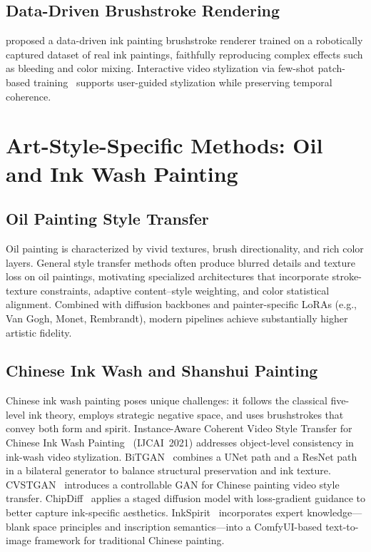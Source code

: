 \documentclass[letterpaper,twocolumn,10pt]{article}
\begin{document}
\subsection{Data-Driven Brushstroke Rendering}

\citet{madono2023data} proposed a data-driven ink painting brushstroke renderer trained
on a robotically captured dataset of real ink paintings, faithfully reproducing complex
effects such as bleeding and color mixing. Interactive video stylization via few-shot
patch-based training~\cite{texler2020interactive} supports user-guided stylization while
preserving temporal coherence.

\section{Art-Style-Specific Methods: Oil and Ink Wash Painting}
\label{sec:artstyle}

\subsection{Oil Painting Style Transfer}

Oil painting is characterized by vivid textures, brush directionality, and rich color
layers. General style transfer methods often produce blurred details and texture loss on
oil paintings, motivating specialized architectures that incorporate stroke-texture
constraints, adaptive content--style weighting, and color statistical alignment.
Combined with diffusion backbones and painter-specific LoRAs (e.g., Van Gogh, Monet,
Rembrandt), modern pipelines achieve substantially higher artistic fidelity.

\subsection{Chinese Ink Wash and Shanshui Painting}

Chinese ink wash painting poses unique challenges: it follows the classical five-level
ink theory, employs strategic negative space, and uses brushstrokes that convey both
form and spirit. Instance-Aware Coherent Video Style Transfer for Chinese Ink Wash
Painting~\cite{liang2021instance} (IJCAI~2021) addresses object-level consistency in
ink-wash video stylization. BiTGAN~\cite{he2023bitgan} combines a UNet path and a ResNet
path in a bilateral generator to balance structural preservation and ink texture.
CVSTGAN~\cite{wang2024cvstgan} introduces a controllable GAN for Chinese painting video
style transfer. ChipDiff~\cite{liu2026chipdiff} applies a staged diffusion model with
loss-gradient guidance to better capture ink-specific aesthetics. InkSpirit~\cite{zhang2025inkspirit}
incorporates expert knowledge---blank space principles and inscription semantics---into a
ComfyUI-based text-to-image framework for traditional Chinese painting.
\end{document}
